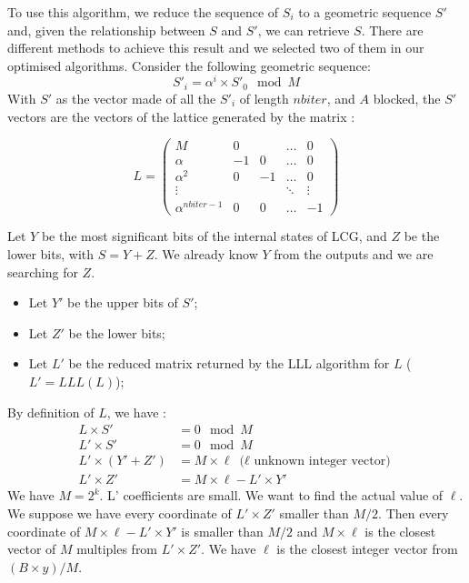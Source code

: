 \documentclass[preprint]{iacrtrans}
\begin{document}
To use this algorithm, we reduce the sequence of $S_i$ to a geometric sequence $S'$ and, given the relationship between $S$ and $S'$, we can retrieve $S$. There are different methods to achieve this result and we selected two of them in our optimised algorithms. Consider the following geometric sequence:
\begin{equation}
    S'_i=\alpha ^i \times S'_0 \mod{M}
\end{equation}
With $S'$ as the vector made of all the $S'_i$ of length $nbiter$, and $A$ blocked, the $S'$ vectors are the vectors of the lattice generated by the matrix :

\begin{equation}
L=
\begin{pmatrix} 
M & 0 & & \dots & 0\\
\alpha & -1 & 0 & \dots & 0\\
\alpha ^2 & 0 & -1 & \dots & 0\\
\vdots & & & \ddots & \vdots\\
\alpha ^{nbiter - 1} & 0 & 0 & \dots & -1
\end{pmatrix}
\end{equation}


Let $Y$ be the most significant bits of the internal states of LCG, and $Z$ be the lower bits, with $S = Y + Z$. We already know $Y$ from the outputs and we are searching for $Z$. 
\begin{itemize}
    \item Let $Y'$ be the upper bits of $S'$;
    \item Let $Z'$ be the lower bits;
    \item Let $L'$  be the reduced matrix returned by the LLL algorithm for $L$ ($L' = LLL(L)$);
\end{itemize}

By definition of $L$, we have :
\begin{align}
    L \times S' &=0 \mod{M}\\
    L' \times S' &= 0 \mod{M}\\
    L' \times (Y' + Z') &= M \times \ell\ \text{($\ell$ unknown integer vector)}\\
    L' \times Z' &= M \times \ell - L' \times Y'
\end{align}
We have $M = 2^k$. L' coefficients are small. We want to find the actual value of $\ell$.\\

We suppose we have every coordinate of $L' \times Z'$ smaller than $M/2$. Then every coordinate of $M \times \ell - L' \times Y'$ is smaller than $M/2$ and $M \times \ell$ is the closest vector of $M$ multiples from $L' \times Z'$. We have $\ell$ is the closest integer vector from $(B \times y)/M$.\\
\end{document}
